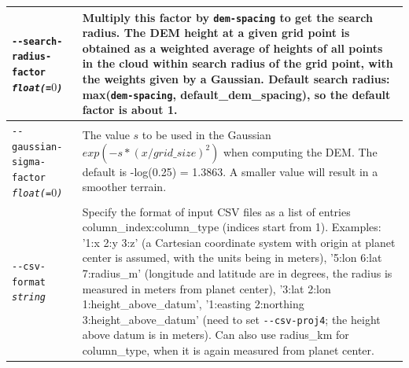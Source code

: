 \begin{longtable}{|p{8cm}|p{9cm}|}
\texttt{-\/-search-radius-factor \textit{float(=$0$)}} & Multiply this factor by \texttt{dem-spacing} to get the search radius. The DEM height at a given grid point is obtained as a weighted average of heights of all points in the cloud within search radius of the grid point, with the weights given by a Gaussian. Default search radius: max(\texttt{dem-spacing}, default\_dem\_spacing), so the default factor is about 1.\\ \hline

\texttt{-\/-gaussian-sigma-factor \textit{float(=$0$)}} & The value $s$ to be used in the Gaussian $exp(-s*(x/grid\_size)^2)$ when computing the DEM. The default is -log(0.25) = 1.3863. A smaller value will result in a smoother terrain. \\ \hline
 
\texttt{-\/-csv-format \textit{string}} & Specify the format of input
CSV files as a list of entries column\_index:column\_type (indices start
from 1). Examples: '1:x 2:y 3:z' (a Cartesian coordinate system with
origin at planet center is assumed, with the units being in meters),
'5:lon 6:lat 7:radius\_m' (longitude and latitude are in degrees, the
radius is measured in meters from planet center), '3:lat 2:lon
1:height\_above\_datum', '1:easting 2:northing 3:height\_above\_datum'
(need to set \texttt{-\/-csv-proj4}; the height above datum is in
meters). Can also use radius\_km for column\_type, when it is again
measured from planet center. \\ \hline


\end{longtable}
